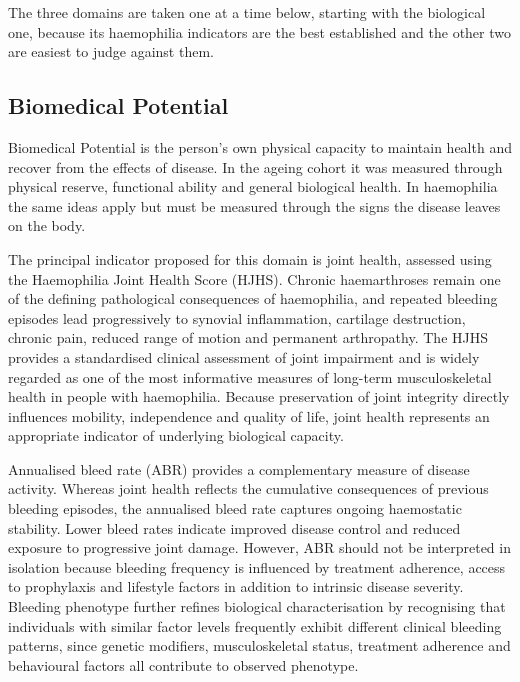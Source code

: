 The three domains are taken one at a time below, starting with the biological
one, because its haemophilia indicators are the best established and the other
two are easiest to judge against them.

\subsection{Biomedical Potential}

Biomedical Potential is the person's own physical capacity to maintain health and recover from the effects of disease. In the ageing cohort it was measured through physical reserve, functional ability and general biological health. In haemophilia the same ideas apply but must be measured through the signs the disease leaves on the body.

The principal indicator proposed for this domain is joint health, assessed using the Haemophilia Joint Health Score (HJHS). Chronic haemarthroses remain one of the defining pathological consequences of haemophilia, and repeated bleeding episodes lead progressively to synovial inflammation, cartilage destruction, chronic pain, reduced range of motion and permanent arthropathy. The HJHS provides a standardised clinical assessment of joint impairment and is widely regarded as one of the most informative measures of long-term musculoskeletal health in people with haemophilia. Because preservation of joint integrity directly influences mobility, independence and quality of life, joint health represents an appropriate indicator of underlying biological capacity.

Annualised bleed rate (ABR) provides a complementary measure of disease activity. Whereas joint health reflects the cumulative consequences of previous bleeding episodes, the annualised bleed rate captures ongoing haemostatic stability. Lower bleed rates indicate improved disease control and reduced exposure to progressive joint damage. However, ABR should not be interpreted in isolation because bleeding frequency is influenced by treatment adherence, access to prophylaxis and lifestyle factors in addition to intrinsic disease severity. Bleeding phenotype further refines biological characterisation by recognising that individuals with similar factor levels frequently exhibit different clinical bleeding patterns, since genetic modifiers, musculoskeletal status, treatment adherence and behavioural factors all contribute to observed phenotype.

